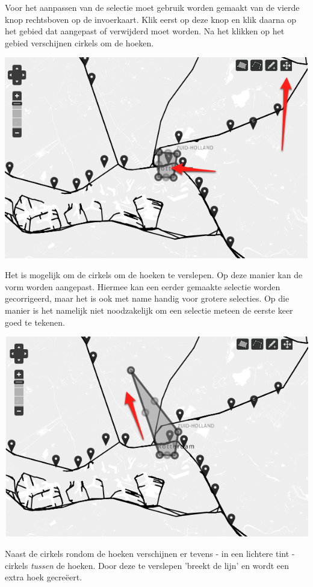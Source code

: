 Voor het aanpassen van de selectie moet gebruik worden gemaakt van de vierde knop rechtsboven op de invoerkaart. Klik eerst op deze knop en klik daarna op het gebied dat aangepast of verwijderd moet worden. Na het klikken op het gebied verschijnen cirkels om de hoeken.
\begin{center}
\includegraphics[scale=.7]{img/kaart5.png}
\end{center}
Het is mogelijk om de cirkels om de hoeken te verslepen. Op deze manier kan de vorm worden aangepast. Hiermee kan een eerder gemaakte selectie worden gecorrigeerd, maar het is ook met name handig voor grotere selecties. Op die manier is het namelijk niet noodzakelijk om een selectie meteen de eerste keer goed te tekenen.
\begin{center}
\includegraphics[scale=.7]{img/kaart6.png}
\end{center}
Naast de cirkels rondom de hoeken verschijnen er tevens - in een lichtere tint - cirkels \emph{tussen} de hoeken. Door deze te verslepen 'breekt de lijn' en wordt een extra hoek gecre\"{e}ert.
